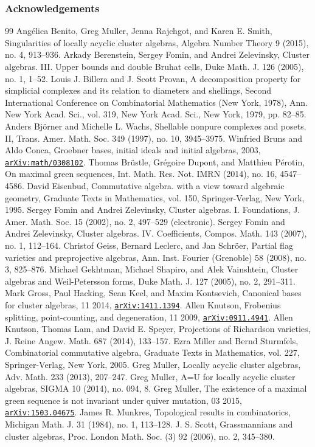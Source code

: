 \documentclass[10pt]{amsart}
\numberwithin{equation}{section}
\newcommand{\arxiv}[1]{\href{http://arxiv.org/abs/#1}{\texttt{arXiv:#1}}}
\theoremstyle{definition}
\theoremstyle{remark}
\newcommand{\1}{^{-1}}
\begin{document}
\subsubsection*{Acknowledgements}
\begin{thebibliography}{99}
 Ang\'elica Benito, Greg Muller, Jenna Rajchgot, and Karen E. Smith, Singularities of locally acyclic cluster algebras, Algebra Number Theory 9 (2015), no. 4, 913--936.
 Arkady Berenstein, Sergey Fomin, and Andrei Zelevinsky, Cluster algebras. III. Upper bounds and double Bruhat cells, Duke Math. J. 126 (2005), no. 1, 1--52.
 Louis J. Billera and J. Scott Provan, A decomposition property for simplicial complexes and its relation to diameters and shellings, Second International Conference on Combinatorial Mathematics (New York, 1978), Ann. New York Acad. Sci., vol. 319, New York Acad. Sci., New York, 1979, pp. 82--85.
 Anders Bj\"orner and Michelle L. Wachs, Shellable nonpure complexes and posets. II, Trans. Amer. Math. Soc. 349 (1997), no. 10, 3945--3975.
 Winfried Bruns and Aldo Conca, Groebner bases, initial ideals and initial algebras, 2003, \arxiv{math/0308102}.
 Thomas Br\"ustle, Gr\'egoire Dupont, and Matthieu P\'erotin, On maximal green sequences, Int. Math. Res. Not. IMRN (2014), no. 16, 4547--4586.
 David Eisenbud, Commutative algebra. with a view toward algebraic geometry, Graduate Texts in Mathematics, vol. 150, Springer-Verlag, New York, 1995.
 Sergey Fomin and Andrei Zelevinsky, Cluster algebras. I. Foundations, J. Amer. Math. Soc. 15 (2002), no. 2, 497--529 (electronic).
 Sergey Fomin and Andrei Zelevinsky, Cluster algebras. IV. Coefficients, Compos. Math. 143 (2007), no. 1, 112--164.
 Christof Geiss, Bernard Leclerc, and Jan Schr\"oer, Partial flag varieties and preprojective algebras, Ann. Inst. Fourier (Grenoble) 58 (2008), no. 3, 825--876.
 Michael Gekhtman, Michael Shapiro, and Alek Vainshtein, Cluster algebras and Weil-Petersson forms, Duke Math. J. 127 (2005), no. 2, 291--311.
 Mark Gross, Paul Hacking, Sean Keel, and Maxim Kontsevich, Canonical bases for cluster algebras, 11 2014, \arxiv{1411.1394}.
 Allen Knutson, Frobenius splitting, point-counting, and degeneration, 11 2009, \arxiv{0911.4941}.
 Allen Knutson, Thomas Lam, and David E. Speyer, Projections of Richardson varieties, J. Reine Angew. Math. 687 (2014), 133--157.
 Ezra Miller and Bernd Sturmfels, Combinatorial commutative algebra, Graduate Texts in Mathematics, vol. 227, Springer-Verlag, New York, 2005.
 Greg Muller, Locally acyclic cluster algebras, Adv. Math. 233 (2013), 207--247.
 Greg Muller, A=U for locally acyclic cluster algebras, SIGMA 10 (2014), no. 094, 8.
 Greg Muller, The existence of a maximal green sequence is not invariant under quiver mutation, 03 2015, \arxiv{1503.04675}.
 James R. Munkres, Topological results in combinatorics, Michigan Math. J. 31 (1984), no. 1, 113--128.
 J. S. Scott, Grassmannians and cluster algebras, Proc. London Math. Soc. (3) 92 (2006), no. 2, 345--380.
\end{thebibliography}
\end{document}
